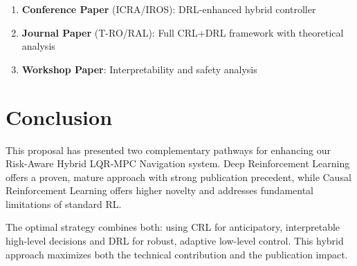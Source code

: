 \documentclass[11pt,a4paper]{article}
\begin{document}
\begin{enumerate}
  \item \textbf{Conference Paper} (ICRA/IROS): DRL-enhanced hybrid controller
  \item \textbf{Journal Paper} (T-RO/RAL): Full CRL+DRL framework with theoretical analysis
  \item \textbf{Workshop Paper}: Interpretability and safety analysis
\end{enumerate}

\section{Conclusion}

This proposal has presented two complementary pathways for enhancing our Risk-Aware Hybrid LQR-MPC Navigation system. Deep Reinforcement Learning offers a proven, mature approach with strong publication precedent, while Causal Reinforcement Learning offers higher novelty and addresses fundamental limitations of standard RL. 

The optimal strategy combines both: using CRL for anticipatory, interpretable high-level decisions and DRL for robust, adaptive low-level control. This hybrid approach maximizes both the technical contribution and the publication impact.
\end{document}
